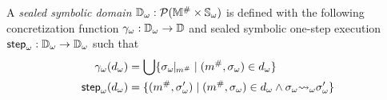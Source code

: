 \begin{definition}\label{def:symbdom}
  A \textit{sealed symbolic domain} ${\mathbb{D}}_\omega: \mathcal{P}({\mathbb{M}}^{\#} \times
  {\mathbb{S}}_\omega)$ is defined with the following concretization function
  ${\gamma}_\omega: {\mathbb{D}}_\omega \rightarrow \mathbb{D}$ and sealed symbolic one-step execution
  ${\textsf{step}}_\omega: {\mathbb{D}}_\omega \rightarrow {\mathbb{D}}_\omega$ such that
  \begin{align}
    {\gamma}_\omega({d}_\omega) &=
    \bigcup \{ {\sigma}_\omega\!\!\mid\!\!_{{m}^{\#}} \mid ({m}^{\#}, {\sigma}_\omega) \in
    {d}_\omega\}\\
    {\textsf{step}}_\omega({d}_\omega) &= \{ ({m}^{\#}, {\sigma}_\omega') \mid ({m}^{\#}, {\sigma}_\omega)
    \in {d}_\omega \wedge {\sigma}_\omega {\leadsto}_\omega {\sigma}_\omega' \}
  \end{align}
\end{definition}
